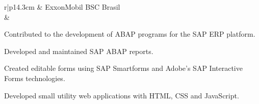 \documentclass[a4paper,12pt]{article}
\begin{document}
\begin{tabular}{r|p{14.3cm}}
& ExxonMobil BSC Brasil\\
&\footnotesize{
    \begin{itemize*}[label=\Large\textbullet]
        \item Contributed to the development of ABAP programs for the SAP ERP platform.
        \item Developed and maintained SAP ABAP reports.
        \item Created editable forms using SAP Smartforms and Adobe's SAP Interactive Forms technologies.
        \item Developed small utility web applications with HTML, CSS and JavaScript.
    \end{itemize*}
}
\\ \\





\end{tabular}
\end{document}

